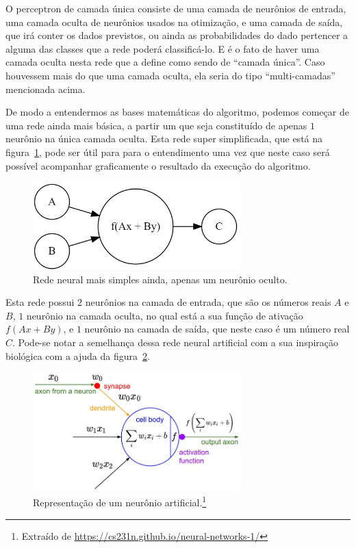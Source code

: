 O perceptron de camada única consiste de uma camada de neurônios de entrada, uma camada oculta de neurônios usados na otimização, e uma camada de saída, que irá conter os dados previstos, ou ainda as probabilidades do dado pertencer a alguma das classes que a rede poderá classificá-lo. E é o fato de haver uma camada oculta nesta rede que a define como sendo de ``camada única''. Caso houvessem mais do que uma camada oculta, ela seria do tipo ``multi-camadas'' mencionada acima.

De modo a entendermos as bases matemáticas do algoritmo, podemos começar de uma rede ainda mais básica, a partir um  que seja constituído de apenas $1$ neurônio na única camada oculta. Esta rede super simplificada, que está na figura~\ref{fig:neuronio}, pode ser útil para para o entendimento uma vez que neste caso será possível acompanhar graficamente o resultado da execução do algoritmo.

\begin{figure}[htb]
\centering
\includegraphics[width=8cm]{figuras/neuronio}
\caption{Rede neural mais simples ainda, apenas um neurônio oculto.}
\label{fig:neuronio}
\end{figure}

Esta rede possui $2$ neurônios na camada de entrada, que são os números reais $A$ e $B$, $1$ neurônio na camada oculta, no qual está a sua função de ativação $f(Ax + By)$, e $1$ neurônio na camada de saída, que neste caso é um número real $C$. Pode-se notar a semelhança dessa rede neural artificial com a sua inspiração biológica com a ajuda da figura~\ref{fig:neuron_model}. 

\begin{figure}[htb]
\centering
\includegraphics[width=8cm]{figuras/neuron_model}
\caption{Representação de um neurônio artificial.\footnote{Extraído de \url{https://cs231n.github.io/neural-networks-1/}}}
\label{fig:neuron_model}
\end{figure}

